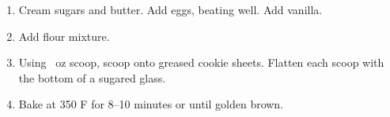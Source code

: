 
\begin{ingredients}
\end{ingredients}


\begin{recipe}
  \begin{enumerate}
  \item Cream sugars and butter.  Add eggs, beating well.  Add
  vanilla.

\item Add flour mixture.

\item Using \fracH\ oz scoop, scoop onto greased cookie sheets.
  Flatten each scoop with the bottom of  a sugared glass.

\item Bake at 350 F for 8--10 minutes or until golden brown.

  \end{enumerate}
\end{recipe}

